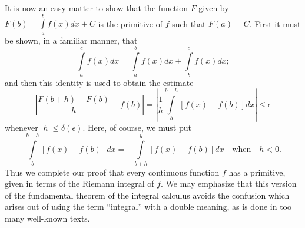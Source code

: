 It is now an easy matter to show that the function $F$ given by $F(b)
= \int\limits^b_{a} f(x) dx + C$ is the primitive of $f$ such that
$F(a) = C$. First it must be shown, in a familiar manner, that
$$
\int\limits^c_a f(x) dx = \int\limits^b_a f(x) dx + \int\limits^c_b
f(x) dx;
$$
and then this identity is used to obtain the estimate
$$
\left|\frac{F(b+h) - F(b)}{h}  - f(b)\right| = \left|
\frac{1}{h} \int\limits^{b+h}_b [f(x) - f(b)] dx  \right|\leqslant \epsilon
$$
whenever $|h| \leqslant \delta (\epsilon)$. Here, of course, we must put
$$
\int\limits^{b+h}_b [f(x) - f(b)] dx = - \int\limits^b_{b+h} [f(x) -
  f(b)] dx \text{~~ when ~~} h < 0.
$$\pageoriginale
Thus we complete our proof that every continuous function $f$ has a
primitive, given in terms of the Riemann integral of $f$. We may
emphasize that this version of the fundamental theorem of the integral
calculus avoids the confusion which arises out of using the term
``integral'' with a double meaning, as is done in too many well-known texts.

